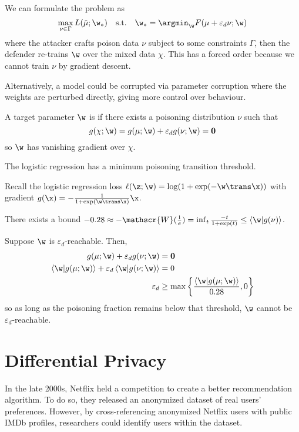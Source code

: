 \documentclass[class=cs480,notes,tikz]{agony}
\begin{document}
We can formulate the problem as
\[ \max_{\nu\in\Gamma} L(\tilde\mu; \w_*) \qq{s.t.} \w_* = \argmin_{\w} F(\mu+\varepsilon_d\nu;\w) \]
where the attacker crafts poison data $\nu$ subject to some constraints $\Gamma$,
then the defender re-trains $\w$ over the mixed data $\chi$.
This has a forced order because we cannot train $\nu$ by gradient descent.

Alternatively, a model could be corrupted via parameter corruption where the
weights are perturbed directly, giving more control over behaviour.

\begin{defn}
  A target parameter $\w$ is 
  if there exists a poisoning distribution $\nu$ such that
  \[ g(\chi;\w) = g(\mu;\w) + \varepsilon_dg(\nu;\w) = \vb 0 \]
  so $\w$ has vanishing gradient over $\chi$.
\end{defn}

\begin{example}
  The logistic regression has a minimum poisoning transition threshold.
\end{example}
\begin{prf}
  Recall the logistic regression loss $\ell(\z;\w) = \log(1+\exp(-\w\trans\x))$
  with gradient $g(\x) = -\frac{1}{1+\exp(\w\trans\x)}\x$.

  There exists a bound $-0.28 \approx -\mathscr{W}(\frac1e) = \inf_t \frac{-t}{1+\exp(t)} \leq \ip{\w}{g(\nu)}$.

  Suppose $\w$ is $\varepsilon_d$-reachable. Then,
  \begin{align*}
    g(\mu;\w) + \varepsilon_dg(\nu;\w)                   & = \vb 0                                          \\
    \ip{\w}{g(\mu;\w)} + \varepsilon_d\ip{\w}{g(\nu;\w)} & = 0                                              \\
    \varepsilon_d                                        & \geq \max\qty{\frac{\ip{\w}{g(\mu;\w)}}{0.28},0}
  \end{align*}
  so as long as the poisoning fraction remains below that threshold,
  $\w$ cannot be $\varepsilon_d$-reachable.
\end{prf}

\section{Differential Privacy}

In the late 2000s, Netflix held a competition to create a better recommendation algorithm.
To do so, they released an anonymized dataset of real users' preferences.
However, by cross-referencing anonymized Netflix users with public IMDb profiles,
researchers could identify users within the dataset.
\end{document}
